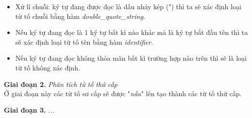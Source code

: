 \begin{itemize}

  \item Xử lí chuỗi: ký tự đang được đọc là dấu nháy kép (") thì ta sẽ xác định loại từ tố chuỗi bằng hàm \textit{double\_quote\_string}.


  \item Nếu ký tự đang đọc là 1 ký tự bất kì nào khác mà là ký tự bắt đầu tên thì ta sẽ xác định loại từ tố tên bằng hàm \textit{identifier}.


  \item Nếu ký tự đang đọc không thỏa mãn bất kì trường hợp nào trên thì sẽ là loại từ tố không xác định.
\end{itemize}


\textbf{Giai đoạn 2.} \textit{Phân tích từ tố thứ cấp}\\
Ở giai đoạn này các từ tố sơ cấp sẽ được "\textit{nấu}" lên tạo thành các từ tố thứ cấp.



\textbf{Giai đoạn 3.} \textit{...}